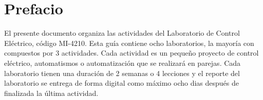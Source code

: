 \newpage
\chapter*{Prefacio}

El presente documento organiza las actividades del Laboratorio de Control Eléctrico, código MI-4210.
Esta guía contiene ocho laboratorios, la mayoría con compuestos por 3 actividades. Cada actividad es un pequeño proyecto de control eléctrico, automatismos o automatización que se realizará en parejas. Cada laboratorio tienen una duración de 2 semanas o 4 lecciones y el reporte del laboratorio se entrega de forma digital como máximo ocho dias después de finalizada la última actividad. 

